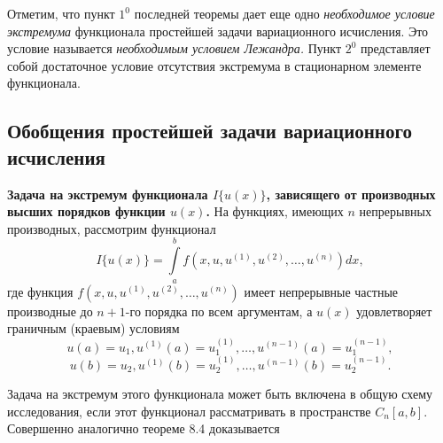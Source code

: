 	Отметим, что пункт $1^0$ последней теоремы дает еще одно {\it необходимое условие экстремума} функционала простейшей задачи вариационного исчисления. Это условие называется {\it необходимым условием Лежандра.} Пункт $2^0$ представляет собой достаточное условие отсутствия экстремума в стационарном элементе функционала.


	\subsection{Обобщения простейшей задачи вариационного исчисления}

	{\bf Задача на экстремум функционала $I\{u(x)\}$, зависящего от производных высших порядков функции $u(x)$.} На функциях, имеющих $n$ непрерывных производных, рассмотрим функционал
	\begin{equation}
		\label{equation_8_6}
		\textstyle I\{u(x)\} = \int\limits_a^b f(x, u, u^{(1)}, u^{(2)}, \dots, u^{(n)})dx,
	\end{equation}
	где функция $f(x, u, u^{(1)}, u^{(2)}, \dots, u^{(n)})$ имеет непрерывные частные производные до $n+1$-го порядка по всем аргументам, а $u(x)$ удовлетворяет граничным (краевым) условиям
	$$u(a)=u_1, u^{(1)}(a)=u_1^{(1)},\dots,u^{(n-1)}(a)=u_1^{(n-1)},$$
	$$u(b)=u_2, u^{(1)}(b)=u_2^{(1)},\dots,u^{(n-1)}(b)=u_2^{(n-1)}.$$

	\vspace{3mm}
	Задача на экстремум этого функционала может быть включена в общую схему исследования, если этот функционал рассматривать в пространстве $C_n[a, b]$. Совершенно аналогично теореме 8.4 доказывается

	\newpage

